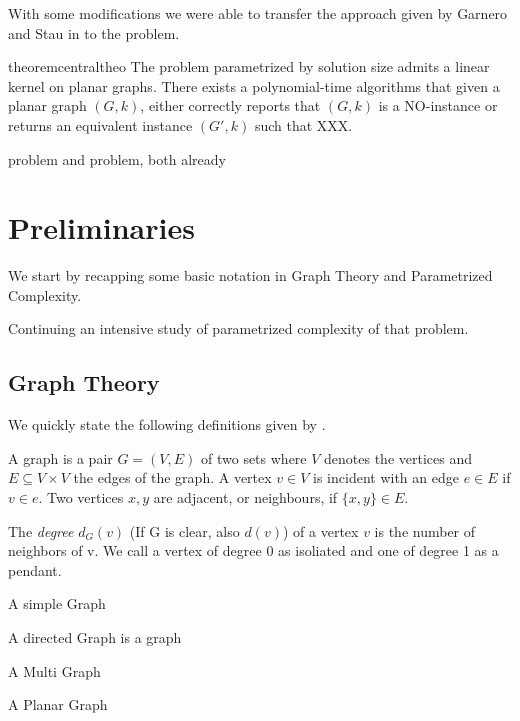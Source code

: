 With some  modifications we were able to transfer the approach given by Garnero and Stau in \cite{Garnero2018} to the \sdom problem.

\begin{restatable}[]{theorem}{centraltheo}\label{thm:central}
    The \sdom problem parametrized by solution size admits a linear kernel on planar graphs. There exists a polynomial-time algorithms that given a planar graph $(G, k)$, either correctly reports that $(G, k)$ is a NO-instance or returns an equivalent instance $(G', k)$ such that XXX.
\end{restatable}

 \dom problem and \tdom problem, both already 

\chapter{Preliminaries}
We start by recapping some basic notation in Graph Theory and Parametrized Complexity. 

Continuing an intensive study of parametrized complexity of that problem. 

\section{Graph Theory}
We quickly state the following definitions given by {\cite[p.~xxx]{diestel10}}.

\begin{definition}
A graph is a pair $G = (V, E)$ of two sets where $V$ denotes the vertices and $E \subseteq V \times V$ the edges of the graph.  A vertex $v \in V$ is incident with an edge $e \in E$ if $v \in e$. Two vertices $x, y$ are adjacent, or neighbours, if $\{x,y \} \in E$.
\end{definition}

\begin{definition}
The \textit{degree} $d_G(v)$ (If G is clear, also $d(v)$) of a vertex $v$ is the number of neighbors of v. We call a vertex of degree 0 as isoliated and one of degree 1 as a pendant.
\end{definition}


\begin{definition}
    A simple Graph

    A directed Graph is a graph

    A Multi Graph

    A Planar Graph
\end{definition}

